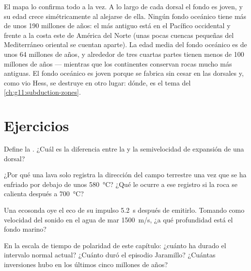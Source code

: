 El mapa lo confirma todo a la vez. A lo largo de cada dorsal el fondo es
joven, y su edad crece simétricamente al alejarse de ella. Ningún fondo
oceánico tiene más de unos \num{190} millones de años: el más antiguo está en
el Pacífico occidental y frente a la costa este de América del Norte (unas
pocas cuencas pequeñas del Mediterráneo oriental se cuentan aparte). La edad
media del fondo oceánico es de unos \num{64} millones de años, y alrededor de
tres cuartas partes tienen menos de 100 millones de años --- mientras que los
continentes conservan rocas mucho más antiguas. El
fondo oceánico es joven porque se fabrica sin cesar en las dorsales y, como
vio Hess, se destruye en otro lugar: dónde, es el tema del
\cref{ch:g11:subduction-zones}.

\section{Ejercicios}

\begin{exercise}[$\star$]\label{exo:g11:drift-to-spreading:1}
Define la . ¿Cuál es la diferencia entre la
 y la semivelocidad de expansión de una dorsal?
\end{exercise}

\begin{exercise}[$\star$]\label{exo:g11:drift-to-spreading:2}
¿Por qué una lava solo registra la dirección del campo terrestre una vez que
se ha enfriado por debajo de unos \qty{580}{\celsius}? ¿Qué le ocurre a ese
registro si la roca se calienta después a \qty{700}{\celsius}?
\end{exercise}

\begin{exercise}[$\star$]\label{exo:g11:drift-to-spreading:3}
Una ecosonda oye el eco de su impulso \qty{5.2}{s} después de emitirlo.
Tomando como velocidad del sonido en el agua de mar \qty{1500}{m/s}, ¿a qué
profundidad está el fondo marino?
\end{exercise}

\begin{exercise}[$\star$]\label{exo:g11:drift-to-spreading:4}
En la escala de tiempo de polaridad de este capítulo: ¿cuánto ha durado el
intervalo normal actual? ¿Cuánto duró el episodio Jaramillo? ¿Cuántas
inversiones hubo en los últimos cinco millones de años?
\end{exercise}

